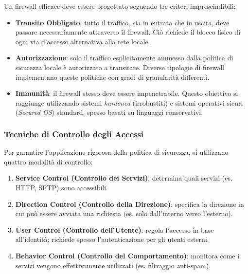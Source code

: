 Un firewall efficace deve essere progettato seguendo tre criteri imprescindibili:

\begin{itemize}
    \item \textbf{Transito Obbligato}: tutto il traffico, sia in entrata che in uscita, 
    deve passare necessariamente attraverso il firewall. Ciò richiede il blocco fisico di 
    ogni via d'accesso alternativa alla rete locale.
    \item \textbf{Autorizzazione}: solo il traffico esplicitamente ammesso dalla politica di 
    sicurezza locale è autorizzato a transitare. Diverse tipologie di firewall implementano queste 
    politiche con gradi di granularità differenti.
    \item \textbf{Immunità}: il firewall stesso deve essere impenetrabile. Questo obiettivo si 
    raggiunge utilizzando sistemi \textit{hardened} (irrobustiti) e sistemi operativi sicuri 
    (\textit{Secured OS}) standard, spesso basati su linguaggi conservativi.
\end{itemize}

\subsubsection{Tecniche di Controllo degli Accessi}

Per garantire l'applicazione rigorosa della politica di sicurezza, si utilizzano quattro modalità di controllo:

\begin{enumerate}
    \item \textbf{Service Control (Controllo dei Servizi)}: determina quali servizi (es. HTTP, SFTP) sono accessibili.
    \item \textbf{Direction Control (Controllo della Direzione)}: specifica la direzione in cui può essere 
    avviata una richiesta (es. solo dall'interno verso l'esterno).
    \item \textbf{User Control (Controllo dell'Utente)}: regola l'accesso in base all'identità; richiede spesso 
    l'autenticazione per gli utenti esterni.
    \item \textbf{Behavior Control (Controllo del Comportamento)}: monitora come i servizi vengono effettivamente 
    utilizzati (es. filtraggio anti-spam).
\end{enumerate}

